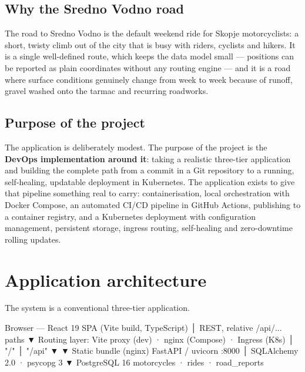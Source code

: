 \documentclass[10pt,a4paper]{article}
\begin{document}
\subsection{Why the Sredno Vodno road}

The road to Sredno Vodno is the default weekend ride for Skopje
motorcyclists: a short, twisty climb out of the city that is busy with riders,
cyclists and hikers. It is a single well-defined route, which keeps the data
model small --- positions can be reported as plain coordinates without any
routing engine --- and it is a road where surface conditions genuinely change
from week to week because of runoff, gravel washed onto the tarmac and
recurring roadworks.

\subsection{Purpose of the project}

The application is deliberately modest. The purpose of the project is the
\textbf{DevOps implementation around it}: taking a realistic three-tier
application and building the complete path from a commit in a Git repository
to a running, self-healing, updatable deployment in Kubernetes. The
application exists to give that pipeline something real to carry:
containerisation, local orchestration with Docker Compose, an automated CI/CD
pipeline in GitHub Actions, publishing to a container registry, and a
Kubernetes deployment with configuration management, persistent storage,
ingress routing, self-healing and zero-downtime rolling updates.

\section{Application architecture}

The system is a conventional three-tier application.

\begin{code}
        Browser — React 19 SPA (Vite build, TypeScript)
                          │  REST, relative /api/... paths
                          ▼
   Routing layer:  Vite proxy (dev) · nginx (Compose) · Ingress (K8s)
              │ "/"                        │ "/api"
              ▼                            ▼
   Static bundle (nginx)          FastAPI / uvicorn :8000
                                           │  SQLAlchemy 2.0 · psycopg 3
                                           ▼
                                  PostgreSQL 16
                          motorcycles · rides · road_reports
\end{code}
\end{document}
